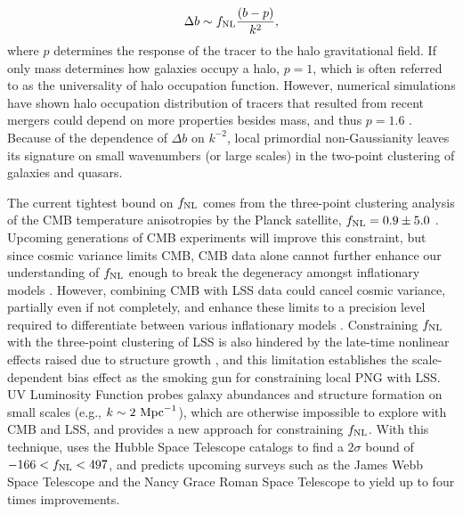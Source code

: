 \begin{equation}\label{eq:db}
\Delta b \sim f_{\rm NL} \frac{(b - p)}{k^{2}},
\end{equation}
where $p$ determines the response of the tracer to the halo gravitational field. If only mass determines how galaxies occupy a halo, $p=1$, which is often referred to as the universality of halo occupation function. However, numerical simulations have shown halo occupation distribution of tracers that resulted from recent mergers could depend on more properties besides mass, and thus $p=1.6$ \citep{slosar2008constraints}. Because of the dependence of $\Delta b$ on $k^{-2}$, local primordial non-Gaussianity leaves its signature on small wavenumbers (or large scales) in the two-point clustering of galaxies and quasars. 

The current tightest bound on $f_{\rm NL}$ comes from the three-point clustering analysis of the CMB temperature anisotropies by the Planck satellite, $f_{\rm NL}=0.9\pm 5.0$ \citep{akrami2019planck}. Upcoming generations of CMB experiments will improve this constraint, but since cosmic variance limits CMB, CMB data alone cannot further enhance our understanding of $f_{\rm NL}$ enough to break the degeneracy amongst inflationary models \citep[see, e.g.,][]{ade2019simons}. However, combining CMB with LSS data could cancel cosmic variance, partially even if not completely, and enhance these limits to a precision level required to differentiate between various inflationary models \citep[see, e.g.,][]{schmittfull2018PhRvD}. Constraining $f_{\rm NL}$ with the three-point clustering of LSS is also hindered by the late-time nonlinear effects raised due to structure growth \citep{baldauf2011galaxy, baldauf2011primordial}, and this limitation establishes the scale-dependent bias effect as the smoking gun for constraining local PNG with LSS. UV Luminosity Function probes galaxy abundances and structure formation on small scales (e.g., $k \sim 2~{\rm Mpc}^{-1}$), which are otherwise impossible to explore with CMB and LSS, and provides a new approach for constraining $f_{\rm NL}$. With this technique, \cite{sabti2021JCAP} uses the Hubble Space Telescope catalogs \citep{bouwens2015ApJ} to find a $2\sigma$ bound of $-166<f_{\rm NL}<497$, and predicts upcoming surveys such as the James Webb Space Telescope and the Nancy Grace Roman Space Telescope to yield up to four times improvements.

